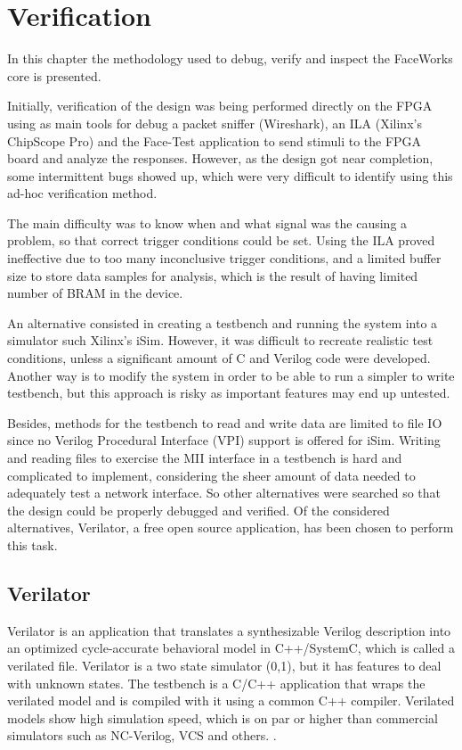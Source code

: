 \documentclass[conference]{IEEEtran}
\begin{document}
\section{Verification}

In this chapter the methodology used to debug, verify and inspect the FaceWorks core is presented. 

Initially, verification of the design was being performed directly on the FPGA using as main tools for debug a packet sniffer (Wireshark), an ILA (Xilinx's ChipScope Pro) and the Face-Test application to send stimuli to the FPGA board and analyze the responses. However, as the design got near completion, some intermittent bugs showed up, which were very difficult to identify using this ad-hoc verification method.

The main difficulty was to know when and what signal was the causing a problem, so that correct trigger conditions could be set. Using the ILA proved ineffective due to too many inconclusive trigger conditions, and a limited buffer size to store data samples for analysis, which is the result of having limited number of BRAM in the device. 

An alternative consisted in creating a testbench and running the system into a simulator such Xilinx's iSim. However, it was difficult to recreate realistic test conditions, unless a significant amount of C and Verilog code were developed. Another way is to modify the system in order to be able to run a simpler to write testbench, but this approach is risky as important features may end up untested.

Besides, methods for the testbench to read and write data are limited to file IO since no Verilog Procedural Interface (VPI) support is offered for iSim. Writing and reading files to exercise the MII interface in a testbench is hard and complicated to implement, considering the sheer amount of data needed to adequately test a network interface.  So other alternatives were searched so that the design could be properly debugged and verified. Of the considered alternatives, Verilator, a free open source application, has been chosen to perform this task.

\subsection{Verilator}

Verilator is an application that translates a synthesizable Verilog description into an optimized cycle-accurate behavioral model in C++/SystemC, which is called a verilated file. Verilator is a two state simulator (0,1), but it has features to deal with unknown states. The testbench is a C/C++ application that wraps the verilated model and is compiled with it using a common C++ compiler. Verilated models show high simulation speed, which is on par or higher than commercial simulators such as NC-Verilog, VCS and others. \cite{veribench}.
\end{document}
